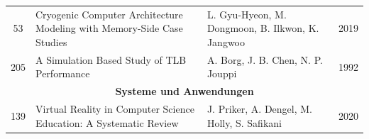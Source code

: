 \begin{longtable}{|c|p{6cm}|p{3cm}|c|}
    \hline
    53 & Cryogenic Computer Architecture Modeling with Memory-Side Case Studies & L. Gyu-Hyeon, M. Dongmoon, B. Ilkwon, K. Jangwoo & 2019 \\
    205 & A Simulation Based Study of TLB Performance & A. Borg, J. B. Chen, N. P. Jouppi & 1992 \\
    \hline
    \multicolumn{4}{c}{\textbf{Systeme und Anwendungen}} \\
    \hline
    139 & Virtual Reality in Computer Science Education: A Systematic Review & J. Priker, A. Dengel, M. Holly, S. Safikani & 2020 \\
    \hline
\end{longtable}


